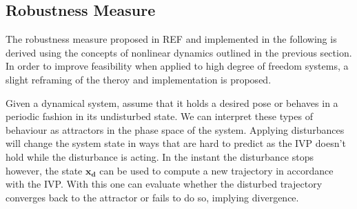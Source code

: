 




     
     

    

    

\subsection{Robustness Measure} \label{robustnessmeasure}

    The robustness measure proposed in REF and implemented in the following is derived using the concepts of nonlinear dynamics outlined in the previous section. In order to improve feasibility when applied to high degree of freedom systems, a slight reframing of the theroy and implementation is proposed.
    
    Given a dynamical system, assume that it holds a desired pose or behaves in a periodic fashion in its undisturbed state. We can interpret these types of behaviour as attractors in the phase space of the system. Applying disturbances will change the system state in ways that are hard to predict as the IVP doesn't hold while the disturbance is acting. In the instant the disturbance stops however, the state $\mathbf{x_d}$ can be used to compute a new trajectory in accordance with the IVP. With this one can evaluate whether the disturbed trajectory converges back to the attractor or fails to do so, implying divergence. %

